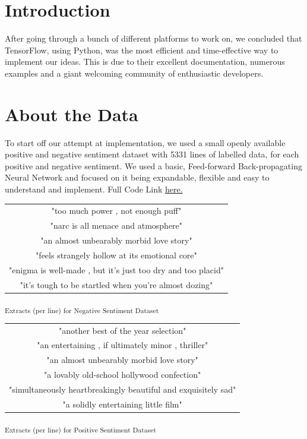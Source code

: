 
\section{Introduction}
After going through a bunch of different platforms to work on, we concluded that TensorFlow, using Python, was the most efficient and time-effective way to implement our ideas. This is due to their excellent documentation, numerous examples and a giant welcoming community of enthusiastic developers.


\section{About the Data}
To start off our attempt at implementation, we used a small openly available positive and negative sentiment dataset with 5331 lines of labelled data, for each positive and negative sentiment. We used a basic, Feed-forward Back-propagating Neural Network and focused on it being expandable, flexible and easy to understand and implement. Full Code Link \href{https://github.com/hsaygan/B.Tech-Project}{here.}


\begin{center}
\begin{tabular}{| c |}
\hline
"too much power , not enough puff"\\
"narc is all menace and atmosphere"\\
"an almost unbearably morbid love story"\\
"feels strangely hollow at its emotional core"\\
"enigma is well-made , but it's just too dry and too placid"\\
"it's tough to be startled when you're almost dozing"\\
\hline
\end{tabular}
\end{center}
\begin{center}
\textsubscript{Extracts (per line) for Negative Sentiment Dataset}
\end{center}

\begin{center}
\begin{tabular}{| c |}
\hline
"another best of the year selection"\\
"an entertaining , if ultimately minor , thriller"\\
"an almost unbearably morbid love story"\\
"a lovably old-school hollywood confection"\\
"simultaneously heartbreakingly beautiful and exquisitely sad"\\
"a solidly entertaining little film"\\
\hline
\end{tabular}\newline
\end{center}
\begin{center}
\textsubscript{Extracts (per line) for Positive Sentiment Dataset}
\end{center}


